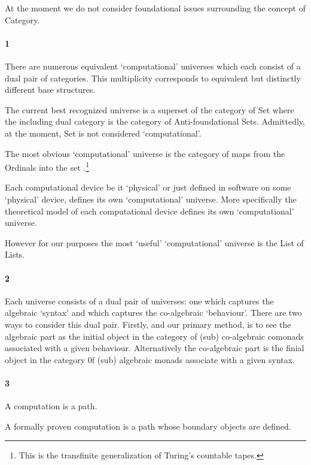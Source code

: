 
At the moment we do not consider foundational issues surrounding the concept of Category.

\paragraph{1}

There are numerous equivalent `computational' universes which each consist of a
dual pair of categories. This multiplicity corresponds to equivalent but
distinctly different base structures.

The current best recognized universe is a superset of the category of Set where
the including dual category is the category of Anti-foundational Sets.
Admittedly, at the moment, Set is not considered `computational'.

The most obvious `computational' universe is the category of maps from the
Ordinals into the set .\footnote{This is the
transfinite generalization of Turing's countable tapes.}

Each computational device be it `physical' or just defined in software on some
`physical' device, defines its own `computational' universe. More specifically
the theoretical model of each computational device defines its own
`computational' universe.

However for our purposes the most `useful' `computational' universe is the List of Lists.

\paragraph{2}

Each universe consists of a dual pair of universes: one which captures the
algebraic `syntax' and which captures the co-algebraic `behaviour'. There are
two ways to consider this dual pair. Firstly, and our primary method, is to see
the algebraic part as the initial object in the category of (sub) co-algebraic
comonads associated with a given behaviour. Alternatively the co-algebraic part
is the finial object in the category 0f (sub) algebraic monads associate with a
given syntax.

\paragraph{3}

A computation is a path.

A formally proven computation is a path whose boundary objects are defined.


